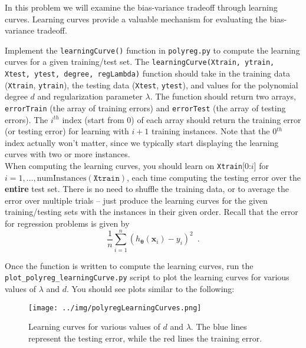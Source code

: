 \documentclass{article}
\begin{document}
\newpage
\begin{aprob}
     In this problem we will examine the bias-variance tradeoff through learning curves. Learning curves provide a valuable mechanism for evaluating the bias-variance tradeoff. 
    
        \item  Implement the \texttt{learningCurve()} function in \texttt{polyreg.py} to compute the learning curves for a given training/test set.  The \texttt{learningCurve(Xtrain, ytrain, Xtest, ytest, degree, regLambda)} function should take in the training data (\texttt{Xtrain}, \texttt{ytrain}), the testing data (\texttt{Xtest}, \texttt{ytest}), and values for the polynomial degree $d$ and regularization parameter $\lambda$. The function should return two arrays, \texttt{errorTrain} (the array of training errors) and \texttt{errorTest} (the array of testing errors).  The $i^{th}$ index (start from 0) of each array should return the training error (or testing error) for learning with $i +1$ training instances.  Note that the 0$^{th}$ index actually won't matter, since we typically start displaying the learning curves with two or more instances.\\
    
    When computing the learning curves, you should learn on \texttt{Xtrain}[0:$i$] for $i = 1, \ldots, \text{numInstances}(\texttt{Xtrain})$, each time computing the testing error over the {\bf entire} test set.  There is no need to shuffle the training data, or to average the error over multiple trials -- just produce the learning curves for the given training/testing sets with the instances in their given order.  Recall that the error for regression problems is given by
    \begin{equation}
        \frac{1}{n} \sum_{i=1}^n (h_{\bm{\theta}}(\mathbf{x}_i) - y_i)^2 \enspace.
    \end{equation}
    
    \item Once the function is written to compute the learning curves, run the \texttt{plot\_polyreg\_learningCurve.py} script to plot the learning curves for various values of $\lambda$ and $d$.  You should see plots similar to the following:
    \begin{figure}[ht!]
        \def\svgwidth{\textwidth}
        \centering
        \vspace{-1em}
        \texttt{[image: ../img/polyregLearningCurves.png]}
        \caption{Learning curves for various values of $d$ and $\lambda$. The blue lines represent the testing error, while the red lines the training error.}
    \end{figure}
    

\end{aprob}
\end{document}
